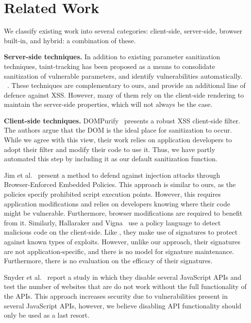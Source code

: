 \section{Related Work}
We classify existing work into several categories: client-side, server-side, browser built-in, and hybrid: a combination of these.

\noindent \textbf{Server-side techniques.}
In addition to existing parameter sanitization techniques,
taint-tracking has been proposed as a means to consolidate
sanitization of vulnerable parameters, and identify vulnerabilities automatically. ~\cite{10.1145/1368088.1368112, Xu:2006:TPE:1267336.1267345,DBLP:conf/sec/Nguyen-TuongGGSE05,Pietraszek:2005:DAI:2146257.2146267,Bisht:2008:XPD:1428322.1428325, 5070521}. These
techniques are complementary to ours, and provide an additional line
of defence against \ac{XSS}. However, many of them rely on the
client-side rendering to maintain the server-side properties, which
will not always be the case.

\noindent \textbf{Client-side techniques.}
DOMPurify~\cite{10.1007/978-3-319-66399-9_7} presents a robust
\ac{XSS} client-side filter. The authors
argue that the DOM is the ideal place for sanitization to occur. While
we agree with this view, their work relies on application developers
to adopt their filter and modify their code to use it. Thus, we have partly automated this step by including it as our default sanitization function.

Jim et al.~\cite{Jim:2007:DSI:1242572.1242654} present a method to
defend against injection attacks through Browser-Enforced Embedded
Policies. This approach is similar to ours, as the policies specify
prohibited script execution points. However, this requires application modifications and relies on	 developers knowing where their code might be vulnerable. Furthermore, browser modifications are required to benefit from it. Similarly, Hallaraker and Vigna~\cite{Hallaraker:2005:DMJ:1078029.1078861} use a
policy language to detect malicious code on the client-side. Like \sys, they make use of signatures to protect against known types of
exploits. However, unlike our approach, their signatures are not
application-specific, and there is no model for signature
maintenance. Furthermore, there is no evaluation on the efficacy of
their signatures.

Snyder et al.~\cite{Snyder:2017:MWD:3133956.3133966} report a study in which
they disable several JavaScript APIs and test the number of websites
that are do not work without the full functionality of the APIs. This approach increases security due to vulnerabilities present in several
JavaScript APIs, however, we believe disabling API functionality
should only be used as a last resort.

